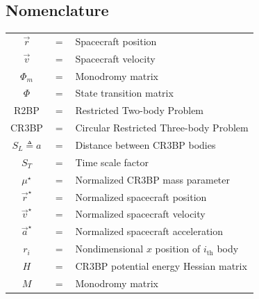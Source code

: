 \documentclass[conf]{new-aiaa}
\begin{document}
\begin{multicols}{2}

\tableofcontents

\section{Nomenclature}
\begin{flushleft}
\begin{tabularx}{\columnwidth}{ccl}
    $\overrightarrow{r}$ & $=$ & Spacecraft position \\
    $\overrightarrow{v}$ & $=$ & Spacecraft velocity \\
    $\Phi_m$             & $=$ & Monodromy matrix \\
    $\Phi$               & $=$ & State transition matrix \\
    R2BP                 & $=$ & Restricted Two-body Problem \\
    CR3BP                & $=$ & Circular Restricted Three-body Problem \\
    $S_L \triangleq a$   & $=$ & Distance between CR3BP bodies \\
    $S_T$                & $=$ & Time scale factor \\
    $\mu^\star$          & $=$ & Normalized CR3BP mass parameter \\
    $\overrightarrow{r}^\star$ & $=$ & Normalized spacecraft position \\
    $\overrightarrow{v}^\star$ & $=$ & Normalized spacecraft velocity \\
    $\overrightarrow{a}^\star$ & $=$ & Normalized spacecraft acceleration \\
    $r_i$                & $=$ & Nondimensional $x$ position of $i_{\text{th}}$ body \\ 
    $H$                  & $=$ & CR3BP potential energy Hessian matrix\\ 
    $M$                  & $=$ & Monodromy matrix\\     
\end{tabularx}
\end{flushleft}


\end{multicols}
\end{document}
